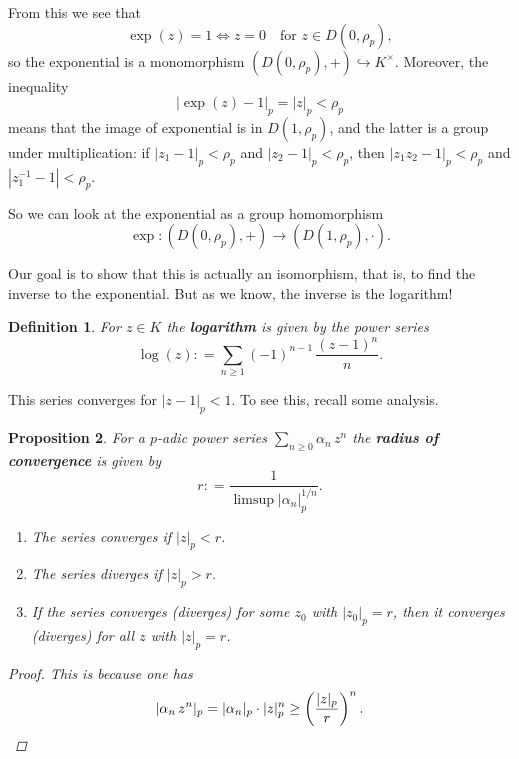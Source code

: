 \documentclass{article}
\newcommand{\term}{\textbf}
\newcommand{\dfn}{\mathrel{\mathop:}=}
\theoremstyle{myplain}
\newtheorem{proposition}{Proposition}[section]
\theoremstyle{mydefinition}
\newtheorem{definition}[proposition]{Definition}
\begin{document}
From this we see that
$$\exp (z) = 1 \iff z = 0 \quad \text{for } z\in D (0,\rho_p),$$
so the exponential is a monomorphism
$(D (0,\rho_p),+) \hookrightarrow K^\times$. Moreover, the inequality
$$|\exp (z) - 1|_p = |z|_p < \rho_p$$
means that the image of exponential is in $D (1,\rho_p)$, and the latter is a
group under multiplication: if $|z_1 - 1|_p < \rho_p$ and
$|z_2 - 1|_p < \rho_p$, then $|z_1 z_2 - 1|_p < \rho_p$ and
$|z_1^{-1} - 1| < \rho_p$.

So we can look at the exponential as a group homomorphism
$$\exp\colon (D (0,\rho_p), +) \to (D (1,\rho_p), \cdot).$$

Our goal is to show that this is actually an isomorphism, that is, to find the
inverse to the exponential. But as we know, the inverse is the logarithm!

\begin{definition}
  For $z\in K$ the \term{logarithm} is given by the power series
  $$\log (z) \dfn \sum_{n \ge 1} (-1)^{n-1} \, \frac{(z-1)^n}{n}.$$
\end{definition}

This series converges for $|z - 1|_p < 1$. To see this, recall some analysis.

\begin{proposition}
  For a $p$-adic power series $\sum_{n \ge 0} \alpha_n\,z^n$ the \term{radius of
    convergence} is given by
  $$r\dfn \frac{1}{\limsup |\alpha_n|_p^{1/n}}.$$

  \begin{enumerate}
  \item The series converges if $|z|_p < r$.

  \item The series diverges if $|z|_p > r$.

  \item If the series converges (diverges) for some $z_0$ with $|z_0|_p = r$,
    then it converges (diverges) for all $z$ with $|z|_p = r$.
  \end{enumerate}

  \begin{proof}
    This is because one has
    \[ |\alpha_n \, z^n|_p = |\alpha_n|_p \cdot |z|_p^n \ge
      \left(\frac{|z|_p}{r}\right)^n. \qedhere \]
  \end{proof}
\end{proposition}
\end{document}
